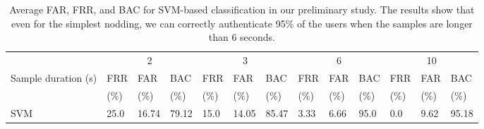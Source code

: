 \begin{table}[b]
\centering\small
\begin{tabular}{|l||l|l|l||l|l|l||l|l|l||l|l|l|}\hline
& \multicolumn{3}{|c||}{2}& \multicolumn{3}{|c||}{3}& \multicolumn{3}{|c||}{6}& \multicolumn{3}{|c|}{10}\\\cline{2-13}
Sample duration (s)& FRR & FAR & BAC & FRR & FAR & BAC & FRR & FAR & BAC & FRR & FAR & BAC\\
&(\%) &(\%) &(\%) &(\%) &(\%) &(\%) &(\%) &(\%) &(\%) &(\%) &(\%) &(\%)\\\hline

SVM          & 25.0 & 16.74 &79.12 & 15.0 & 14.05 & 85.47 & 3.33& 6.66& 95.0  & 0.0& 9.62& 95.18\\\hline

\end{tabular}
\caption{Average FAR, FRR, and BAC for SVM-based classification in our preliminary study. The results show that even for the simplest nodding, we can correctly authenticate 95\% of the users when the samples are longer than 6 seconds. \label{tab:kfoldfalse-svm}}
\end{table}


